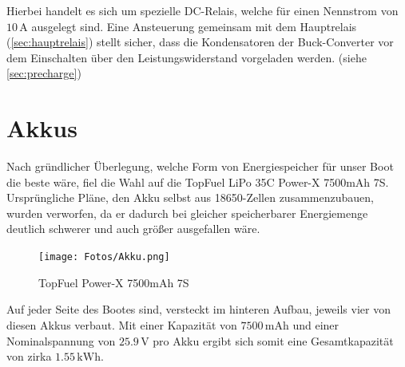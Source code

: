 Hierbei handelt es sich um spezielle DC-Relais, welche für einen Nennstrom von $10\,\mathrm{A}$ ausgelegt sind.
Eine Ansteuerung gemeinsam mit dem Hauptrelais (\ref{sec:hauptrelais}) stellt sicher, dass die Kondensatoren der Buck-Converter vor dem Einschalten über den Leistungswiderstand vorgeladen werden. (siehe \autoref{sec:precharge})

\newpage
\section{Akkus \label{sec:Akkus}}
Nach gründlicher Überlegung, welche Form von Energiespeicher für unser Boot die beste wäre, fiel die Wahl auf die TopFuel LiPo 35C Power-X 7500mAh 7S.
Ursprüngliche Pläne, den Akku selbst aus 18650-Zellen zusammenzubauen, wurden verworfen, da er dadurch bei gleicher speicherbarer Energiemenge deutlich schwerer und auch größer ausgefallen wäre.
\begin{figure}[h]
    \centering
    \texttt{[image: Fotos/Akku.png]}
    \caption{TopFuel Power-X 7500mAh 7S}
\end{figure}

Auf jeder Seite des Bootes sind, versteckt im hinteren Aufbau, jeweils vier von diesen Akkus verbaut. Mit einer Kapazität von $7500\,\textrm{mAh}$ und einer Nominalspannung von $25.9\,\mathrm{V}$ pro Akku ergibt sich somit eine Gesamtkapazität von zirka $1.55\,\mathrm{kWh}$.

\newpage